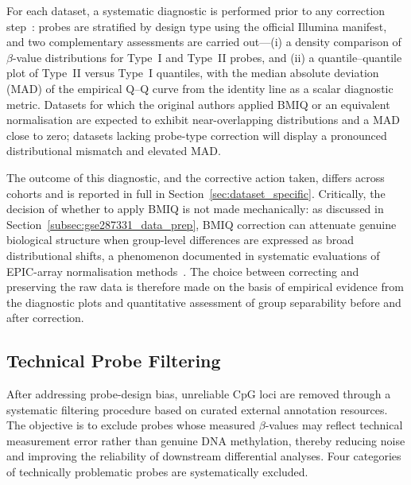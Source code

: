 For each dataset, a systematic diagnostic is performed prior to any 
correction step~\cite{Teschendorff2013BMIQ, Wang2015Normalization450K}: probes are 
stratified by design type using the official Illumina manifest, and two 
complementary assessments are carried out—(i) a density comparison of 
$\beta$-value distributions for Type~I and Type~II probes, and (ii) a 
quantile--quantile plot of Type~II versus Type~I quantiles, with the 
median absolute deviation (MAD) of the empirical Q--Q curve from the identity line 
as a scalar diagnostic metric. Datasets for which the original authors 
applied BMIQ or an equivalent normalisation are expected to exhibit 
near-overlapping distributions and a MAD close to zero; datasets lacking 
probe-type correction will display a pronounced distributional mismatch 
and elevated MAD.

The outcome of this diagnostic, and the corrective action taken, differs 
across cohorts and is reported in full in Section~\ref{sec:dataset_specific}. 
Critically, the decision of whether to apply BMIQ is not made 
mechanically: as discussed in Section~\ref{subsec:gse287331_data_prep}, BMIQ 
correction can attenuate genuine biological structure when group-level 
differences are expressed as broad distributional shifts, a phenomenon 
documented in systematic evaluations of EPIC-array normalisation 
methods~\cite{Yousefi2013, Welsh2023EPICnorm, Liu2016Processing}. The choice between 
correcting and preserving the raw data is therefore made on the basis of 
empirical evidence from the diagnostic plots and quantitative assessment 
of group separability before and after correction.

\subsection{Technical Probe Filtering}
\label{subsec:step2}

After addressing probe-design bias, unreliable CpG loci are removed 
through a systematic filtering procedure based on curated external 
annotation resources. The objective is to exclude probes whose measured 
$\beta$-values may reflect technical measurement error rather than 
genuine DNA methylation, thereby reducing noise and improving the 
reliability of downstream differential analyses. Four categories of technically problematic probes are systematically excluded.

